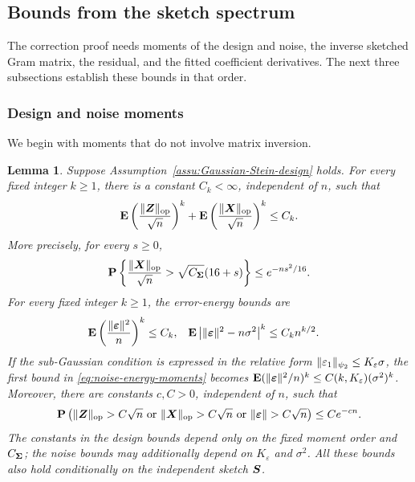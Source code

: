 \documentclass{article}
\theoremstyle{plain} %
\newtheorem{lemma}[theorem]{Lemma}
\theoremstyle{definition} %
\theoremstyle{definition} %
\begin{document}
\subsection{Bounds from the sketch spectrum}
\label{app:auxiliary-lemmas-and-proofs}

The correction proof needs moments of the design and noise, the inverse
sketched Gram matrix, the residual, and the fitted coefficient derivatives.
The next three subsections establish these bounds in that order.

\subsubsection{Design and noise moments}

We begin with moments that do not involve matrix inversion.

\begin{lemma}
\label{lem:opnorm-X-bound}
Suppose Assumption~\ref{assu:Gaussian-Stein-design} holds.
For every fixed integer $k\geq1$, there is a constant $C_k<\infty$,
independent of $n$, such that
\begin{align}
    {\mathbf{E}}\left(\frac{\lVert\boldsymbol{Z}\rVert_{\rm op}}{\sqrt n}\right)^k
    +{\mathbf{E}}\left(\frac{\lVert\boldsymbol{X}\rVert_{\rm op}}{\sqrt n}\right)^k
    \leq C_k.
    \label{eq:opnorm-XZ-moments}
\end{align}
More precisely, for every $s\geq0$,
\begin{align}
    {\mathbf{P}}\left\{
       \frac{\lVert\boldsymbol{X}\rVert_{\rm op}}{\sqrt n}
       >\sqrt{C_{\boldsymbol{\Sigma}}}(16+s)
    \right\}
    \leq e^{-ns^2/16}.
    \label{eq:opnorm-X-tail}
\end{align}
For every fixed integer $k\geq1$, the error-energy bounds are
\begin{align}
    {\mathbf{E}}\left(\frac{\lVert{\boldsymbol{\varepsilon} }\rVert^2}{n}\right)^k
       &\leq C_k,
    &
    {\mathbf{E}}\left|\lVert{\boldsymbol{\varepsilon} }\rVert^2-n\sigma^2\right|^k
       &\leq C_kn^{k/2}.
    \label{eq:noise-energy-moments}
\end{align}
If the sub-Gaussian condition is expressed in the relative form
$\lVert\varepsilon_1\rVert_{\psi_2}\leq K_\varepsilon\sigma$, the first bound in
\eqref{eq:noise-energy-moments} becomes
${\mathbf{E}}(\lVert{\boldsymbol{\varepsilon} }\rVert^2/n)^k\leq C(k,K_\varepsilon)(\sigma^2)^k$.
Moreover, there are constants $c,C>0$,
independent of $n$, such that
\begin{align}
    {\mathbf{P}}\left(
       \lVert\boldsymbol{Z}\rVert_{\rm op}>C\sqrt n
       \ \text{or}\
       \lVert\boldsymbol{X}\rVert_{\rm op}>C\sqrt n
       \ \text{or}\
       \lVert{\boldsymbol{\varepsilon} }\rVert>C\sqrt n
    \right)
    \leq Ce^{-cn}.
    \label{eq:design-noise-tail}
\end{align}
The constants in the design bounds depend only on the fixed moment order and
$C_{\boldsymbol{\Sigma}}$; the noise bounds may additionally depend on
$K_\varepsilon$ and $\sigma^2$.
All these bounds also hold conditionally on the independent sketch $\boldsymbol{S}$.
\end{lemma}
\end{document}
